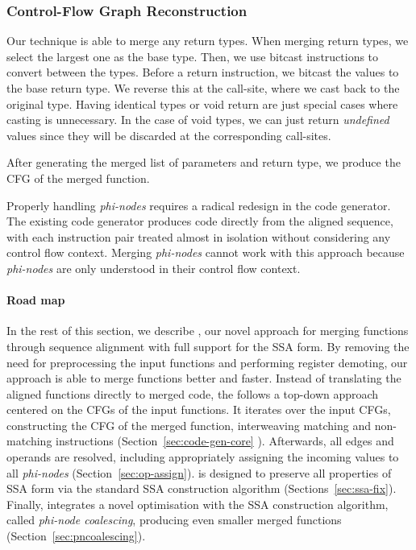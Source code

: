 \subsubsection{Control-Flow Graph Reconstruction}

Our technique is able to merge any return types.
When merging return types, we select the largest one as the base type.
Then, we use bitcast instructions to convert between the types.
Before a return instruction, we bitcast the values to the base return type.
We reverse this at the call-site, where we cast back to the original type.
Having identical types or void return are just special cases where casting is
unnecessary.
In the case of void types, we can just return \textit{undefined} values since they
will be discarded at the corresponding call-sites.

After generating the merged list of parameters and return type, we produce the
CFG of the merged function.









Properly handling \textit{phi-nodes} requires a radical redesign in the code generator. The existing code generator produces code directly
from the aligned sequence, with each instruction pair treated almost in isolation without considering any control flow context. Merging
\textit{phi-nodes} cannot work with this approach because \textit{phi-nodes} are only understood in their control flow context.

\paragraph*{Road map} In the rest of this section, we describe {\ProjName}, our novel approach for merging functions through sequence alignment with full
support for the SSA form. By removing the need for preprocessing the input functions and performing register demoting, our approach is able
to merge functions better and faster. Instead of translating the aligned functions directly to merged code, the {\ProjName} follows a
top-down approach centered on the CFGs of the input functions. It iterates over the input CFGs, constructing the
CFG of the merged function, interweaving matching and non-matching instructions (Section~\ref{sec:code-gen-core}
). Afterwards, all edges and operands are resolved, including appropriately assigning the incoming values to all \textit{phi-nodes} (Section~\ref{sec:op-assign}).
{\ProjName} is designed to preserve all properties of SSA form via the standard SSA construction algorithm (Sections~\ref{sec:ssa-fix}).
Finally, {\ProjName} integrates a novel optimisation with the SSA construction algorithm, called \textit{phi-node coalescing}, producing even smaller merged functions (Section~\ref{sec:pncoalescing}).

